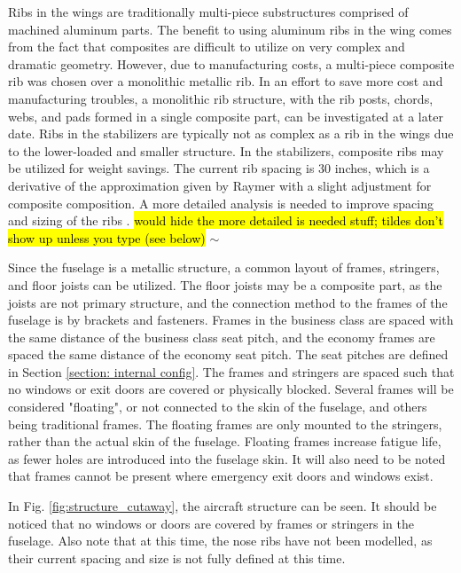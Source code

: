 Ribs in the wings are traditionally multi-piece substructures comprised of machined aluminum parts. The benefit to using aluminum ribs in the wing comes from the fact that composites are difficult to utilize on very complex and dramatic geometry. However, due to manufacturing costs, a multi-piece composite rib was chosen over a monolithic metallic rib. In an effort to save more cost and manufacturing troubles, a monolithic rib structure, with the rib posts, chords, webs, and pads formed in a single composite part, can be investigated at a later date. Ribs in the stabilizers are typically not as complex as a rib in the wings due to the lower-loaded and smaller structure. In the stabilizers, composite ribs may be utilized for weight savings. The current rib spacing is 30 inches, which is a derivative of the approximation given by Raymer with a slight adjustment for composite composition. A more detailed analysis is needed to improve spacing and sizing of the ribs \cite{raymer}. \hl{would hide the more detailed is needed stuff; tildes don't show up unless you type (see below)}
$\sim$

Since the fuselage is a metallic structure, a common layout of frames, stringers, and floor joists can be utilized. The floor joists may be a composite part, as the joists are not primary structure, and the connection method to the frames of the fuselage is by brackets and fasteners. Frames in the business class are spaced with the same distance of the business class seat pitch, and the economy frames are spaced the same distance of the economy seat pitch. The seat pitches are defined in Section \ref{section: internal config}. The frames and stringers are spaced such that no windows or exit doors are covered or physically blocked. Several frames will be considered "floating", or not connected to the skin of the fuselage, and others being traditional frames. The floating frames are only mounted to the stringers, rather than the actual skin of the fuselage. Floating frames increase fatigue life, as fewer holes are introduced into the fuselage skin. It will also need to be noted that frames cannot be present where emergency exit doors and windows exist.

In Fig. \ref{fig:structure_cutaway}, the aircraft structure can be seen. It should be noticed that no windows or doors are covered by frames or stringers in the fuselage. Also note that at this time, the nose ribs have not been modelled, as their current spacing and size is not fully defined at this time.

